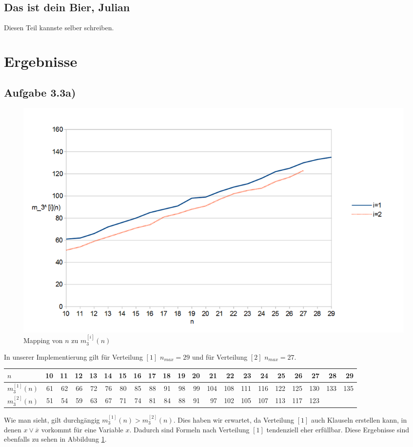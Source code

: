 \documentclass[maincolor=black]{exercise}
\newcommand{\non}[1]{\overline{#1}}
\begin{document}
\subsection{Das ist dein Bier, Julian}
Diesen Teil kannste selber schreiben.

\section*{Ergebnisse}
\subsection{Aufgabe 3.3a)}
\begin{figure}[t]
	\includegraphics[width=\linewidth]{Diagram.png}
	\caption{Mapping von $n$ zu $m_3^{[i]}(n)$\label{fig:diagram}}
\end{figure}
In unserer Implementierung gilt für Verteilung $[1]$ $n_{max} = 29$ und für Verteilung $[2]$ $n_{max} = 27$.\\
\begin{adjustwidth}{-1cm}{}
\begin{tabular}{l|rrrrrrrrrrrrrrrrrrrr}
	$n$ & 10 & 11 & 12 & 13 & 14 & 15 & 16 & 17 & 18 & 19 & 20 & 21 & 22 & 23 & 24 & 25 & 26 & 27 & 28 & 29\\
	\midrule
	$m_3^{[1]}(n)$ & 61 & 62 & 66 & 72 & 76 & 80 & 85 & 88 & 91 & 98 & 99 & 104 & 108 & 111 & 116 & 122 & 125 & 130 & 133 & 135\\
	\midrule
	$m_3^{[2]}(n)$ & 51 & 54 & 59 & 63 & 67 & 71 & 74 & 81 & 84 & 88 & 91 & 97 & 102 & 105 & 107 & 113 & 117 & 123 & & \\
\end{tabular}
\end{adjustwidth}
\vspace{10pt}
Wie man sieht, gilt durchgängig $m_3^{[1]}(n) > m_3^{[2]}(n)$. Dies haben wir erwartet, da Verteilung $[1]$ auch Klauseln erstellen kann, in denen $x \vee \non{x}$ vorkommt für eine Variable $x$. Dadurch sind Formeln nach Verteilung $[1]$ tendenziell eher erfüllbar. Diese Ergebnisse sind ebenfalls zu sehen in Abbildung \ref{fig:diagram}.
\end{document}
